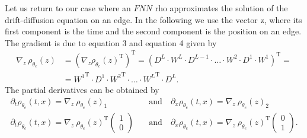 Let us return to our case where an $FNN$ rho approximates the solution of the drift-diffusion equation on an edge. In the following we use the vector z, where its first component is the time and the second component is the position on an edge. The gradient is due to equation 3 and equation 4 given by 
\begin{equation}
    \begin{split}
        \nabla_{z}  \ \rho_{\theta_e}\left(z\right) & = \left(\nabla_{z} \rho_{\theta_e}\left(z\right)^{\mathrm{T}} \right)^{\mathrm{T}} = \left(D^L \cdot W^L \cdot D^{L-1} \cdot \ldots \cdot W^2 \cdot D^1 \cdot W^{1} \right)^{\mathrm{T}} = \\
        & = {W^{1}}^{\mathrm{T}} \cdot D^{1} \cdot {W^{2}}^{\mathrm{T}} \cdot \ldots \cdot {W^{L}}^{\mathrm{T}}  \cdot  D^{L}. 
    \end{split}
\end{equation}
The partial derivatives can be obtained by 
\begin{equation*}
    \begin{split}
        \partial_t \rho_{\theta_e}\left(t,x\right) = \nabla_{z} \ \rho_{\theta_e}\left(z\right)_1 \quad & \text{and} \quad \partial_x \rho_{\theta_e}\left(t,x\right) = \nabla_{z} \ \rho_{\theta_e}\left(z\right)_2 \\
        \partial_t \rho_{\theta_e}\left(t,x\right) = {\nabla_{z} \ \rho_{\theta_e}\left(z\right)}^{\mathrm{T}} \begin{pmatrix} 1 \\ 0 \end{pmatrix} \quad & \text{and} \quad \partial_x \rho_{\theta_e}\left(t,x\right) = {\nabla_{z} \ \rho_{\theta_e}\left(z\right)}^{\mathrm{T}} \begin{pmatrix} 0 \\ 1 \end{pmatrix}.
    \end{split}
\end{equation*}




